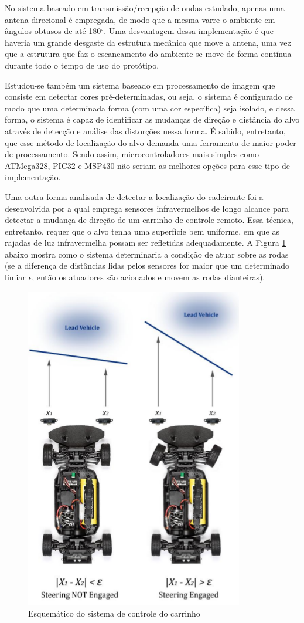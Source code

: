 \par No sistema baseado em transmissão/recepção de ondas estudado, apenas uma antena direcional é empregada, de modo que a mesma varre o ambiente em ângulos obtusos de até 180$^{\circ}$. Uma desvantagem dessa implementação é que haveria um grande desgaste da estrutura mecânica que move a antena, uma vez que a estrutura que faz o escaneamento do ambiente se move de forma contínua durante todo o tempo de uso do protótipo. 

\par Estudou-se também um sistema baseado em processamento de imagem  \cite{isobe2014human} que consiste em detectar cores pré-determinadas, ou seja, o sistema é configurado de modo que uma determinada forma (com uma cor específica) seja isolado, e dessa forma, o sistema é capaz de identificar as mudanças de direção e distância do alvo através de detecção e análise das distorções nessa forma. É sabido, entretanto, que esse método de localização do alvo demanda uma ferramenta de maior poder de processamento. Sendo assim, microcontroladores mais simples como ATMega328, PIC32 e MSP430 não seriam as melhores opções para esse tipo de implementação.

\par Uma outra forma analisada de detectar a localização do cadeirante foi a desenvolvida por \cite{calcar} a qual emprega sensores infravermelhos de longo alcance para detectar a mudança de direção de um carrinho de controle remoto. Essa técnica, entretanto, requer que o alvo tenha uma superfície bem uniforme, em que as rajadas de luz infravermelha possam ser refletidas adequadamente. A Figura \ref{fig:IRbot} abaixo mostra como o sistema determinaria a condição de atuar sobre as rodas (se a diferença de distâncias lidas pelos sensores for maior que um determinado limiar $\epsilon$, então os atuadores são acionados e movem as rodas dianteiras).
\newpage
 
 \begin{figure}[ht]
		\centering
		\includegraphics[width=.3\textwidth]{figuras/IRbot.png}
		\caption{Esquemático do sistema de controle do carrinho}
		\label{fig:IRbot}
	\end{figure} 

